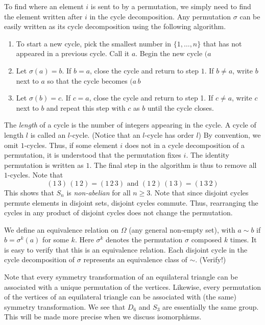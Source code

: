 To find where an element $i$ is sent to by a permutation, we simply need to find the element written after $i$ in the cycle decomposition. Any permutation $\sigma$ can be easily written as its cycle decomposition using the following algorithm. 
\begin{enumerate}
    \item To start a new cycle, pick the smallest number in $\{1, \ldots, n\}$ that has not appeared in a previous cycle. Call it $a$. Begin the new cycle $(a$
    \item Let $\sigma(a) = b$. If $b=a$, close the cycle and return to step $1$. If $b \neq a$, write $b$ next to $a$ so that the cycle becomes $(a \, b$
    \item Let $\sigma(b) = c$. If $c = a$, close the cycle and return to step 1. If $c \neq a$, write $c$ next to $b$ and repeat this step with $c$ as $b$ until the cycle closes.
\end{enumerate}

The \emph{length} of a cycle is the number of integers appearing in the cycle. A cycle of length $l$ is called an $l$-cycle. (Notice that an $l$-cycle has order $l$) By convention, we omit $1$-cycles. Thus, if some element $i$ does not in a cycle decomposition of a permutation, it is understood that the permutation fixes $i$. The identity permutation is written as $1$. The final step in the algorithm is thus to remove all $1$-cycles. Note that
\[
    (1 \, 3) \, (1 \, 2) = (1 \, 2 \, 3) \text{ and } (1 \, 2) \, (1\, 3) = (1 \, 3 \, 2)
\]  
This shows that $S_n$ is \emph{non-abelian} for all $n \geq 3$. Note that since disjoint cycles permute elements in disjoint sets, disjoint cycles commute. Thus, rearranging the cycles in any product of disjoint cycles does not change the permutation. 


\begin{rem}
    We define an equivalence relation on $\Omega$ (any general non-empty set), with $a \sim b$ if $b = \sigma^k(a)$ for some $k$. Here $\sigma^k$ denotes the permutation $\sigma$ composed $k$ times. It is easy to verify that this is an equivalence relation. Each disjoint cycle in the cycle decomposition of $\sigma$ represents an equivalence class of $\sim$. (Verify!)
\end{rem}

Note that every symmetry transformation of an equilateral triangle can be associated with a unique permutation of the vertices. Likewise, every permutation of the vertices of an equilateral triangle can be associated with (the same) symmetry transformation. We see that $D_6$ and $S_3$ are essentially the same group. This will be made more precise when we discuss isomorphisms.

